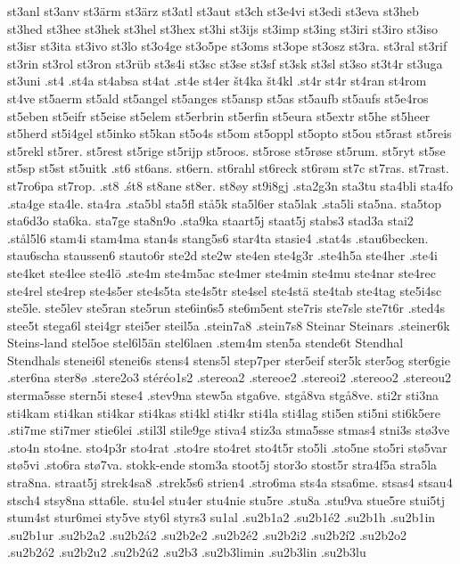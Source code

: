 {{st3anl
st3anv
st3ärm
st3ärz
st3atl
st3aut
st3ch
st3e4vi
st3edi
st3eva
st3heb
st3hed
st3hee
st3hek
st3hel
st3hex
st3hi
st3ijs
st3imp
st3ing
st3iri
st3iro
st3iso
st3isr
st3ita
st3ivo
st3lo
st3o4ge
st3o5pe
st3oms
st3ope
st3osz
st3ra.
st3ral
st3rif
st3rin
st3rol
st3ron
st3rüb
st3s4i
st3sc
st3se
st3sf
st3sk
st3sl
st3so
st3t4r
st3uga
st3uni
.st4
.st4a
st4absa
st4at
.st4e
st4er
št4ka
št4kl
.st4r
st4r
st4ran
st4rom
st4ve
st5aerm
st5ald
st5angel
st5anges
st5ansp
st5as
st5aufb
st5aufs
st5e4ros
st5eben
st5eifr
st5eise
st5elem
st5erbrin
st5erfin
st5eura
st5extr
st5he
st5heer
st5herd
st5i4gel
st5inko
st5kan
st5o4s
st5om
st5oppl
st5opto
st5ou
st5rast
st5reis
st5rekl
st5rer.
st5rest
st5rige
st5rijp
st5roos.
st5rose
st5røse
st5rum.
st5ryt
st5se
st5sp
st5st
st5uitk
.st6
st6ans.
st6ern.
st6rahl
st6reck
st6røm
st7c
st7ras.
st7rast.
st7ro6pa
st7rop.
.st8
.śt8
st8ane
st8er.
st8øy
st9i8gj
.sta2g3n
sta3tu
sta4bli
sta4fo
.sta4ge
sta4le.
sta4ra
.sta5bl
sta5fl
stå5k
sta5l6er
sta5lak
.sta5li
sta5na.
sta5top
sta6d3o
sta6ka.
sta7ge
sta8n9o
.sta9ka
staart5j
staat5j
stabs3
stad3a
stai2
.stål5l6
stam4i
stam4ma
stan4s
stang5s6
star4ta
stasie4
.stat4s
.stau6becken.
stau6scha
staussen6
stauto6r
ste2d
ste2w
ste4en
ste4g3r
.ste4h5a
ste4her
.ste4i
ste4ket
ste4lee
ste4lö
.ste4m
ste4m5ac
ste4mer
ste4min
ste4mu
ste4nar
ste4rec
ste4rel
ste4rep
ste4s5er
ste4s5ta
ste4s5tr
ste4sel
ste4stä
ste4tab
ste4tag
ste5i4sc
ste5le.
ste5lev
ste5ran
ste5run
ste6in6s5
ste6m5ent
ste7ris
ste7sle
ste7t6r
.sted4s
stee5t
stega6l
stei4gr
stei5er
steil5a
.stein7a8
.stein7s8
Steinar
Steinars
.steiner6k
Steins-land
stel5oe
stel6l5än
stel6laen
.stem4m
sten5a
stende6t
Stendhal
Stendhals
stenei6l
stenei6s
stens4
stens5l
step7per
ster5eif
ster5k
ster5og
ster6gie
.ster6na
ster8ø
.stere2o3
stéréo1s2
.stereoa2
.stereoe2
.stereoi2
.stereoo2
.stereou2
sterma5sse
stern5i
stese4
.stev9na
stew5a
stga6ve.
stgå8va
stgå8ve.
sti2r
sti3na
sti4kam
sti4kan
sti4kar
sti4kas
sti4kl
sti4kr
sti4la
sti4lag
sti5en
sti5ni
sti6k5ere
.sti7me
sti7mer
stie6lei
.stil3l
stile9ge
stiva4
stiz3a
stma5sse
stmas4
stni3s
stø3ve
.sto4n
sto4ne.
sto4p3r
sto4rat
.sto4re
sto4ret
sto4t5r
sto5li
.sto5ne
sto5ri
stø5var
stø5vi
.sto6ra
stø7va.
stokk-ende
stom3a
stoot5j
stor3o
stost5r
stra4f5a
stra5la
stra8na.
straat5j
strek4sa8
.strek5s6
strien4
.stro6ma
sts4a
stsa6me.
stsas4
stsau4
stsch4
stsy8na
stta6le.
stu4el
stu4er
stu4nie
stu5re
.stu8a
.stu9va
stue5re
stui5tj
stum4st
stur6mei
sty5ve
sty6l
styrs3
su1al
.su2b1a2
.su2b1é2
.su2b1h
.su2b1in
.su2b1ur
.su2b2a2
.su2b2á2
.su2b2e2
.su2b2é2
.su2b2i2
.su2b2í2
.su2b2o2
.su2b2ó2
.su2b2u2
.su2b2ú2
.su2b3
.su2b3limin
.su2b3lin
.su2b3lu
}}

